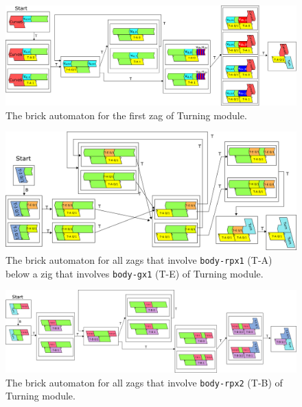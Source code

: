 \documentclass[runningheads]{llncs}
\begin{document}
\begin{figure}[ht]
\centering
\includegraphics[width=\linewidth]{Figs/Turner_BA/T-A_under_DFAO.png}
\caption{The brick automaton for the first zag of Turning module.}
\label{fig:BA_T-A_under_DFAO}
\end{figure}

\begin{figure}[ht]
\centering
\includegraphics[width=\linewidth]{Figs/Turner_BA/T-A_under_gx_left.png}
\caption{The brick automaton for all zags that involve \texttt{body-rpx1} (T-A) below a zig that involves \texttt{body-gx1} (T-E) of Turning module.}
\label{fig:BA_T-A_under_gx_left}
\end{figure}

\begin{figure}[ht]
\centering
\includegraphics[width=\linewidth]{Figs/Turner_BA/T-B.png}
\caption{The brick automaton for all zags that involve \texttt{body-rpx2} (T-B) of Turning module.}
\label{fig:BA_T-B}
\end{figure}
\end{document}
